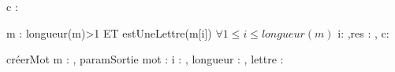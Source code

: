 \begin{algorithme}%
        {c : \caractere}%
        {\booleen}%
        {}
         {%
            {}%
            {}%
        }%
 \end{algorithme}

 \begin{algorithme}%
        {m : \chaine}%
        {\booleen}%
        {longueur(m)>1 ET estUneLettre(m[i]) $\forall 1\leq i \leq longueur(m)$}%
        {i: \entier,res : \booleen, c: \caractere}%
         {%
            {}%
           {
                {%
                }
            }%
            {}%
        }
 \end{algorithme}

  \begin{algorithme}%
     {créerMot}
     {m : \chaine}%
     {, paramSortie {mot : \Mot} }%
     {i : \entier, longueur : \entier, lettre : \caractere }%
 \end{algorithme}

 
